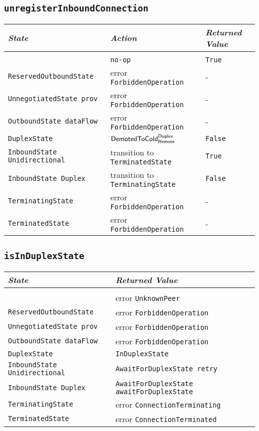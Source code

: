 \documentclass{article}
\def\InitialState{\textbullet}
\def\ReservedOutboundState{\texttt{ReservedOutboundState}}
\def\UnnegotiatedStateAny{\texttt{UnnegotiatedState prov}}
\def\OutboundStateAny{\texttt{OutboundState dataFlow}}
\def\DuplexState{\texttt{DuplexState}}
\def\InboundStateUni{\texttt{InboundState Unidirectional}}
\def\InboundStateDup{\texttt{InboundState Duplex}}
\def\TerminatingState{\texttt{TerminatingState}}
\def\TerminatedState{\texttt{TerminatedState}}
\def\DemotedToColdDupRem{$\text{\textsf{DemotedToCold}}^\text{\textsf{Duplex}}_\text{\textsf{Remote}}$}
\def\True{\texttt{True}}
\def\False{\texttt{False}}
\begin{document}
\subsection{\texttt{unregisterInboundConnection}}
\begin{center}
  \begin{tabular}[h]{lll}
    \textit{State}           & \textit{Action} & \textit{Returned Value}\\\hline\\[2pt]
    \InitialState{}          & \texttt{no-op} & \True \\[8pt]
    \ReservedOutboundState{} & error \texttt{ForbiddenOperation} & - \\[8pt]
    \UnnegotiatedStateAny{}  & error \texttt{ForbiddenOperation} & - \\[8pt]
    \OutboundStateAny{}      & error \texttt{ForbiddenOperation} & - \\[8pt]
    \DuplexState{}           & \DemotedToColdDupRem{}            & \False \\[8pt]
    \InboundStateUni{}       & transition to \TerminatedState{}  & \True \\[8pt]
    \InboundStateDup{}       & transition to \TerminatingState{} & \False \\[8pt]
    \TerminatingState{}      & error \texttt{ForbiddenOperation} & - \\[8pt]
    \TerminatedState{}       & error \texttt{ForbiddenOperation} & - \\[8pt]
  \end{tabular}
\end{center}

\subsection{\texttt{isInDuplexState}}
\begin{center}
  \begin{tabular}[h]{lll}
    \textit{State}           & \textit{Returned Value}\\\hline\\[2pt]
    \InitialState{}          & error \texttt{UnknownPeer}           \\[8pt]
    \ReservedOutboundState{} & error \texttt{ForbiddenOperation}    \\[8pt]
    \UnnegotiatedStateAny{}  & error \texttt{ForbiddenOperation}    \\[8pt]
    \OutboundStateAny{}      & error \texttt{ForbiddenOperation}    \\[8pt]
    \DuplexState{}           & \texttt{InDuplexState}               \\[8pt]
    \InboundStateUni{}       & \texttt{AwaitForDuplexState retry}   \\[8pt]
    \InboundStateDup{}       & \texttt{AwaitForDuplexState awaitForDuplexState} \\[8pt]
    \TerminatingState{}      & error \texttt{ConnectionTerminating} \\[8pt]
    \TerminatedState{}       & error \texttt{ConnectionTerminated}  \\[8pt]
  \end{tabular}
\end{center}
\end{document}
